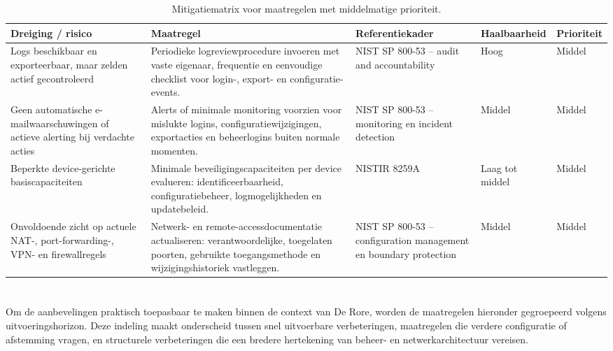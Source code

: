 \begin{table}[H]
    \centering
    \scriptsize
    \caption[Mitigatiematrix met middelmatige prioriteit]{Mitigatiematrix voor maatregelen met middelmatige prioriteit.}
    \label{tab:app-mitigaties-middel}
    \begin{tabularx}{\textwidth}{p{}X p{}p{}p{}}
        \hline
        \textbf{Dreiging / risico} & \textbf{Maatregel} & \textbf{Referentiekader} & \textbf{Haalbaarheid} & \textbf{Prioriteit} \\
        \hline
        Logs beschikbaar en exporteerbaar, maar zelden actief gecontroleerd &
        Periodieke logreviewprocedure invoeren met vaste eigenaar, frequentie en eenvoudige checklist voor login-, export- en configuratie-events. &
        NIST SP 800-53 -- audit and accountability &
        Hoog & Middel \\
        \hline
        Geen automatische e-mailwaarschuwingen of actieve alerting bij verdachte acties &
        Alerts of minimale monitoring voorzien voor mislukte logins, configuratiewijzigingen, exportacties en beheerlogins buiten normale momenten. &
        NIST SP 800-53 -- monitoring en incident detection &
        Middel & Middel \\
        \hline
        Beperkte device-gerichte basiscapaciteiten &
        Minimale beveiligingscapaciteiten per device evalueren: identificeerbaarheid, configuratiebeheer, logmogelijkheden en updatebeleid. &
        NISTIR 8259A &
        Laag tot middel & Middel \\
        \hline
        Onvoldoende zicht op actuele NAT-, port-forwarding-, VPN- en firewallregels &
        Netwerk- en remote-accessdocumentatie actualiseren: verantwoordelijke, toegelaten poorten, gebruikte toegangsmethode en wijzigingshistoriek vastleggen. &
        NIST SP 800-53 -- configuration management en boundary protection &
        Middel & Middel \\
        \hline
    \end{tabularx}
\end{table}

\clearpage

\section{}%
\label{app:gefaseerde-prioritering}

Om de aanbevelingen praktisch toepasbaar te maken binnen de context van De Rore, worden de maatregelen hieronder gegroepeerd volgens uitvoeringshorizon. Deze indeling maakt onderscheid tussen snel uitvoerbare verbeteringen, maatregelen die verdere configuratie of afstemming vragen, en structurele verbeteringen die een bredere hertekening van beheer- en netwerkarchitectuur vereisen.

